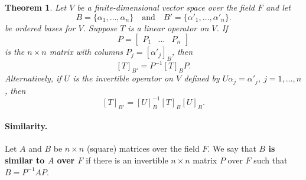 \documentclass{article}
\newtheorem{theorem}{Theorem}[section]
\begin{document}
\begin{theorem}
  Let $V$ be a finite-dimensional vector space over the field $F$ and let \[
    B = \{\alpha_1, \ldots, \alpha_n\}\quad\text{and}\quad
    B' = \{\alpha'_1, \ldots, \alpha'_n\}.
  \] be ordered bases for $V$. Suppose $T$ is a linear operator on $V$. If \[
    P = \begin{bmatrix}
      P_1 & \ldots & P_n
    \end{bmatrix}
  \] is the $n \times n$ matrix with columns $P_j = [\alpha'_j]_B$, then \[
    [T]_{B'} = P^{-1}[T]_BP.
  \] Alternatively, if $U$ is the invertible operator on $V$ defined by
  $U\alpha_j = \alpha'_j$, $j = 1, \ldots, n$, then \[
    [T]_{B'} = [U]^{-1}_B [T]_B [U]_B.
  \]
\end{theorem}

\paragraph{Similarity.} Let $A$ and $B$ be $n \times n$ (square) matrices over
the field $F$. We say that \textbf{$B$ is similar to $A$ over $F$} if there is
an invertible $n \times n$ matrix $P$ over $F$ such that $B = P^{-1}AP$.
\end{document}
